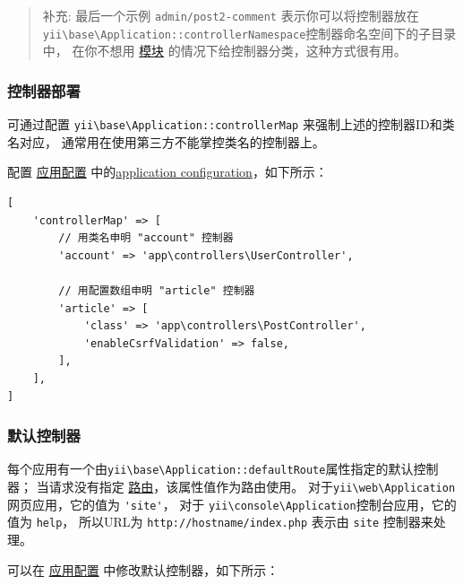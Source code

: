 \begin{quote}补充: 最后一个示例 \lstinline|admin/post2-comment| 表示你可以将控制器放在
  \texttt{yii{\allowbreak{}\textbackslash}base{\allowbreak{}\textbackslash}Application\allowbreak{}::\allowbreak{}controllerNamespace}控制器命名空间下的子目录中，
  在你不想用 \hyperref[structure-modules.md]{模块} 的情况下给控制器分类，这种方式很有用。

\end{quote}
\subsubsection{控制器部署 \label{structure-controllers.md::controller-map}}
可通过配置 \texttt{yii{\allowbreak{}\textbackslash}base{\allowbreak{}\textbackslash}Application\allowbreak{}::\allowbreak{}controllerMap} 来强制上述的控制器ID和类名对应，
通常用在使用第三方不能掌控类名的控制器上。

配置 \hyperref[structure-applications.md::application-configurations]{应用配置} 
中的\hyperref[structure-applications.md::application-configurations]{application configuration}，如下所示：

\lstset{language=php}\begin{lstlisting}
[
    'controllerMap' => [
        // 用类名申明 "account" 控制器
        'account' => 'app\controllers\UserController',

        // 用配置数组申明 "article" 控制器
        'article' => [
            'class' => 'app\controllers\PostController',
            'enableCsrfValidation' => false,
        ],
    ],
]
\end{lstlisting}
\subsubsection{默认控制器 \label{structure-controllers.md::default-controller}}
每个应用有一个由\texttt{yii{\allowbreak{}\textbackslash}base{\allowbreak{}\textbackslash}Application\allowbreak{}::\allowbreak{}defaultRoute}属性指定的默认控制器；
当请求没有指定 \hyperref[structure-controllers.md::::ids-routes]{路由}，该属性值作为路由使用。
对于\texttt{yii{\allowbreak{}\textbackslash}web{\allowbreak{}\textbackslash}Application}网页应用，它的值为 \lstinline|'site'|，
对于 \texttt{yii{\allowbreak{}\textbackslash}console{\allowbreak{}\textbackslash}Application}控制台应用，它的值为 \lstinline|help|，
所以URL为 \lstinline|http://hostname/index.php| 表示由 \lstinline|site| 控制器来处理。

可以在 \hyperref[structure-applications.md::application-configurations]{应用配置} 中修改默认控制器，如下所示：

